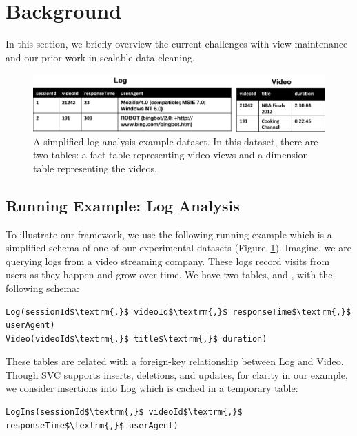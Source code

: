 \section{Background}\label{sec-background}
In this section, we briefly overview the current challenges with view maintenance and
our prior work in scalable data cleaning.

\begin{figure}[t] 
\centering
\vspace{-0.75em}
 \includegraphics[width=\columnwidth]{figs/sample-clean-example.png}\vspace{-0.25em}
 \caption{A simplified log analysis example dataset. In this dataset, there are two tables: a fact table representing video views and a dimension table representing the videos.\label{example-1}}\vspace{-1em}
\end{figure}

\subsection{Running Example: Log Analysis}
To illustrate our framework, we use the following running example which is a 
simplified schema of one of our experimental datasets (Figure~\ref{example-1}).
Imagine, we are querying logs from a video streaming company. 
These logs record visits from users as they happen and grow over time.
We have two tables,  and , with the following schema:

\begin{lstlisting}[mathescape]
Log(sessionId$\textrm{,}$ videoId$\textrm{,}$ responseTime$\textrm{,}$ userAgent)
Video(videoId$\textrm{,}$ title$\textrm{,}$ duration)
\end{lstlisting}
These tables are related with a foreign-key relationship between
Log and Video.
Though SVC supports inserts, deletions, and updates, for clarity in our example, we consider insertions
into Log which is cached in a temporary table:

\begin{lstlisting}[mathescape]
LogIns(sessionId$\textrm{,}$ videoId$\textrm{,}$ responseTime$\textrm{,}$ userAgent)
\end{lstlisting}


